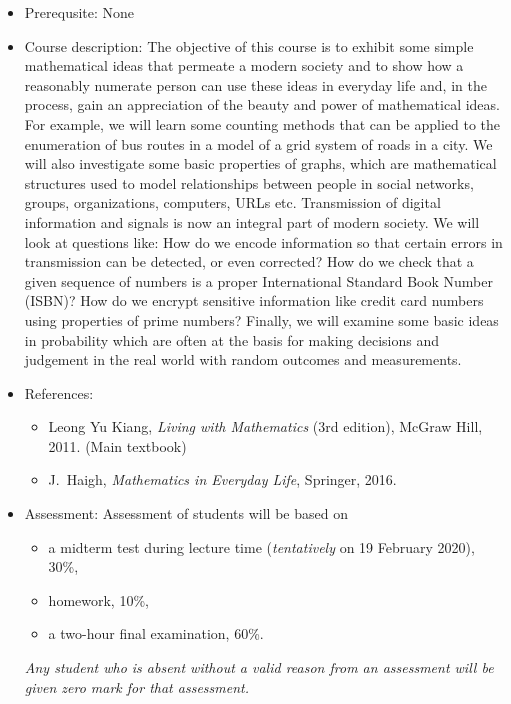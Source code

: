 \documentclass[a4paper]{article}
\begin{document}
\begin{itemize}
\item Prerequsite: None
  
\item Course description:  The objective of this course is to exhibit some simple mathematical ideas that permeate a modern society and to show how a reasonably numerate person can use these ideas in everyday life and, in the process, gain an appreciation of the beauty and power of mathematical ideas. For example, we will learn some counting methods that can be applied to the enumeration of bus routes in a model of a grid system of roads in a city. We will also investigate some basic properties of graphs, which are mathematical structures used to model relationships between people in social networks, groups, organizations, computers, URLs etc. Transmission of digital information and signals is now an integral part of modern society. We will look at questions like: How do we encode information so that certain errors in transmission can be detected, or even corrected? How do we check that a given sequence of numbers is a proper International Standard Book Number (ISBN)? How do we encrypt sensitive information like credit card numbers using properties of prime numbers? Finally, we will examine some basic ideas in probability which are often at the basis for making decisions and judgement in the real world with random outcomes and measurements.

\item References:
  \begin{itemize}
  \item
    Leong Yu Kiang, \emph{Living with Mathematics} (3rd edition), McGraw Hill, 2011. (Main textbook)
  \item    
    J.~Haigh, \emph{Mathematics in Everyday Life}, Springer, 2016.
  \end{itemize}
\item Assessment:
  Assessment of students will be based on
  \begin{itemize}
  \item a midterm test during lecture time (\emph{tentatively} on 19 February 2020), 30\%,
  \item homework, 10\%,
  \item a two-hour final examination, 60\%.
  \end{itemize}
  \emph{Any student who is absent without a valid reason from an assessment will be given zero mark for that assessment.}
\end{itemize}
\end{document}
